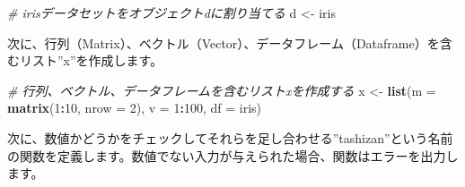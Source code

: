 \documentclass[
]{article}
\newenvironment{Shaded}{\begin{snugshade}}{\end{snugshade}}
\newcommand{\AttributeTok}[1]{\textcolor[rgb]{0.13,0.29,0.53}{#1}}
\newcommand{\CommentTok}[1]{\textcolor[rgb]{0.56,0.35,0.01}{\textit{#1}}}
\newcommand{\DecValTok}[1]{\textcolor[rgb]{0.00,0.00,0.81}{#1}}
\newcommand{\FunctionTok}[1]{\textcolor[rgb]{0.13,0.29,0.53}{\textbf{#1}}}
\newcommand{\NormalTok}[1]{#1}
\newcommand{\OtherTok}[1]{\textcolor[rgb]{0.56,0.35,0.01}{#1}}
\newcommand{\SpecialCharTok}[1]{\textcolor[rgb]{0.81,0.36,0.00}{\textbf{#1}}}
\begin{document}
\begin{Shaded}
\begin{Highlighting}[]
\CommentTok{\# irisデータセットをオブジェクトdに割り当てる}
\NormalTok{d }\OtherTok{\textless{}{-}}\NormalTok{ iris}
\end{Highlighting}
\end{Shaded}

次に、行列（Matrix）、ベクトル（Vector）、データフレーム（Dataframe）を含むリスト''x''を作成します。

\begin{Shaded}
\begin{Highlighting}[]
\CommentTok{\# 行列、ベクトル、データフレームを含むリストxを作成する}
\NormalTok{x }\OtherTok{\textless{}{-}} \FunctionTok{list}\NormalTok{(}\AttributeTok{m =} \FunctionTok{matrix}\NormalTok{(}\DecValTok{1}\SpecialCharTok{:}\DecValTok{10}\NormalTok{, }\AttributeTok{nrow =} \DecValTok{2}\NormalTok{), }\AttributeTok{v =} \DecValTok{1}\SpecialCharTok{:}\DecValTok{100}\NormalTok{, }\AttributeTok{df =}\NormalTok{ iris)}
\end{Highlighting}
\end{Shaded}

次に、数値かどうかをチェックしてそれらを足し合わせる''tashizan''という名前の関数を定義します。数値でない入力が与えられた場合、関数はエラーを出力します。
\end{document}
